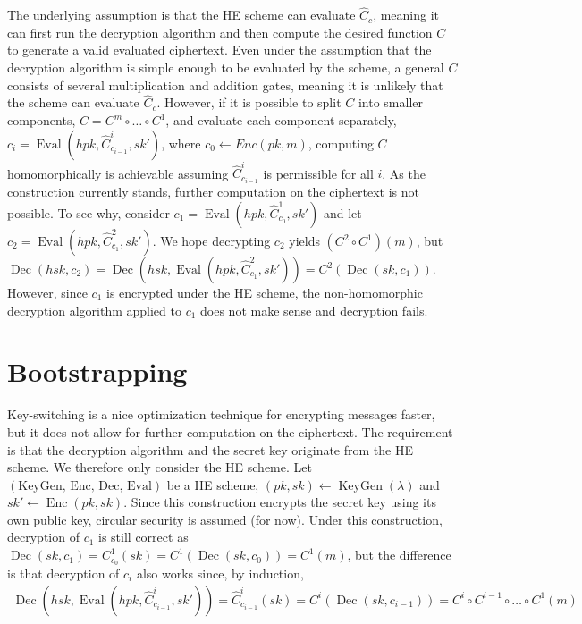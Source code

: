 The underlying assumption is that the HE scheme can evaluate $\hat{C}_c$, meaning it can first run the decryption algorithm and then compute the desired function $C$ to generate a valid evaluated ciphertext. Even under the assumption that the decryption algorithm is simple enough to be evaluated by the scheme, a general $C$ consists of several multiplication and addition gates, meaning it is unlikely that the scheme can evaluate $\hat{C}_c$. However, if it is possible to split $C$ into smaller components, $C = C^m \circ \dots \circ C^1$, and evaluate each component separately, $c_i = \operatorname{Eval}(hpk,\hat{C}^i_{c_{i-1}}, sk')$, where $c_0 \leftarrow Enc(pk,m)$, computing $C$ homomorphically is achievable assuming $\hat{C}^i_{c_{i-1}}$ is permissible for all $i$. As the construction currently stands, further computation on the ciphertext is not possible. To see why, consider $c_1 = \operatorname{Eval}(hpk,\hat{C}^1_{c_0}, sk')$ and let $c_2 = \operatorname{Eval}(hpk,\hat{C}^2_{c_1}, sk')$. We hope decrypting $c_2$ yields $(C^2 \circ C^1)(m)$, but $\operatorname{Dec}(hsk,c_2) = \operatorname{Dec}(hsk,\operatorname{Eval}(hpk,\hat{C}^2_{c_1}, sk')) = C^2(\operatorname{Dec}(sk, c_1))$. However, since $c_1$ is encrypted under the HE scheme, the non-homomorphic decryption algorithm applied to $c_1$ does not make sense and decryption fails.

\section{Bootstrapping}
Key-switching is a nice optimization technique for encrypting messages faster, but it does not allow for further computation on the ciphertext. The requirement is that the decryption algorithm and the secret key originate from the HE scheme. We therefore only consider the HE scheme. Let $(\text{KeyGen, Enc, Dec, Eval})$ be a HE scheme, $(pk, sk) \leftarrow \operatorname{KeyGen}(\lambda)$ and $sk' \leftarrow \operatorname{Enc}(pk, sk)$. Since this construction encrypts the secret key using its own public key, circular security is assumed (for now). Under this construction, decryption of $c_1$ is still correct as $\operatorname{Dec}(sk, c_1) = C^1_{c_0}(sk) = C^1(\operatorname{Dec}(sk,c_0)) = C^1(m)$, but the difference is that decryption of $c_i$ also works since, by induction,
\begin{equation*}
    \begin{aligned}
        \operatorname{Dec}(hsk,\operatorname{Eval}(hpk,\hat{C}^i_{c_{i-1}}, sk')) = \hat{C}^i_{c_{i-1}}(sk) = C^i(\operatorname{Dec}(sk, c_{i-1})) = C^i \circ C^{i-1} \circ  \dots \circ C^1(m)
    \end{aligned}
\end{equation*}

